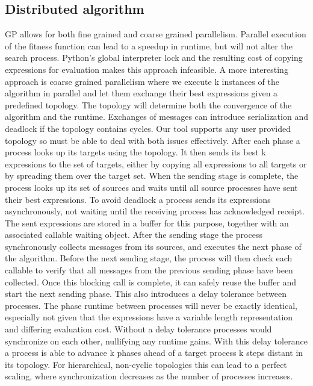 \subsection{Distributed algorithm}
GP allows for both fine grained and coarse grained parallelism. Parallel execution of the fitness function can lead to a speedup in runtime, but will not alter the search process. Python's global interpreter lock and the resulting cost of copying expressions for evaluation makes this approach infeasible. A more interesting approach is coarse grained parallelism where we execute k instances of the algorithm in parallel and let them exchange their best expressions given a predefined topology. The topology will determine both the convergence of the algorithm and the runtime. Exchanges of messages can introduce serialization and deadlock if the topology contains cycles. Our tool supports any user provided topology so must be able to deal with both issues effectively. 
After each phase a process looks up its targets using the topology. It then sends its best k expressions to the set of targets, either by copying all expressions to all targets or by spreading them over the target set. When the sending stage is complete, the process looks up its set of sources and waits until all source processes have sent their best expressions. To avoid deadlock a process sends its expressions asynchronously, not waiting until the receiving process has acknowledged receipt. The sent expressions are stored in a buffer for this purpose, together with an associated callable waiting object. After the sending stage the process synchronously collects messages from its sources, and executes the next phase of the algorithm. Before the next sending stage, the process will then check each callable to verify that all messages from the previous sending phase have been collected. Once this blocking call is complete, it can safely reuse the buffer and start the next sending phase. This also introduces a delay tolerance between processes. The phase runtime between processes will never be exactly identical, especially not given that the expressions have a variable length representation and differing evaluation cost. Without a delay tolerance processes would synchronize on each other, nullifying any runtime gains. With this delay tolerance a process is able to advance k phases ahead of a target process k steps distant in its topology. 
For hierarchical, non-cyclic topologies this can lead to a perfect scaling, where synchronization decreases as the number of processes increases.
